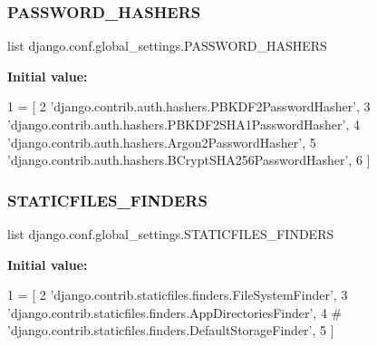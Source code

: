 \subsubsection{\texorpdfstring{P\+A\+S\+S\+W\+O\+R\+D\+\_\+\+H\+A\+S\+H\+E\+RS}{PASSWORD\_HASHERS}}
{\footnotesize\ttfamily list django.\+conf.\+global\+\_\+settings.\+P\+A\+S\+S\+W\+O\+R\+D\+\_\+\+H\+A\+S\+H\+E\+RS}

{\bfseries Initial value\+:}
\begin{DoxyCode}
1 =  [
2     \textcolor{stringliteral}{'django.contrib.auth.hashers.PBKDF2PasswordHasher'},
3     \textcolor{stringliteral}{'django.contrib.auth.hashers.PBKDF2SHA1PasswordHasher'},
4     \textcolor{stringliteral}{'django.contrib.auth.hashers.Argon2PasswordHasher'},
5     \textcolor{stringliteral}{'django.contrib.auth.hashers.BCryptSHA256PasswordHasher'},
6 ]
\end{DoxyCode}
\mbox{\label{namespacedjango_1_1conf_1_1global__settings_afd0fc571b22162beb11ee333d3189cec}} 
\subsubsection{\texorpdfstring{S\+T\+A\+T\+I\+C\+F\+I\+L\+E\+S\+\_\+\+F\+I\+N\+D\+E\+RS}{STATICFILES\_FINDERS}}
{\footnotesize\ttfamily list django.\+conf.\+global\+\_\+settings.\+S\+T\+A\+T\+I\+C\+F\+I\+L\+E\+S\+\_\+\+F\+I\+N\+D\+E\+RS}

{\bfseries Initial value\+:}
\begin{DoxyCode}
1 =  [
2     \textcolor{stringliteral}{'django.contrib.staticfiles.finders.FileSystemFinder'},
3     \textcolor{stringliteral}{'django.contrib.staticfiles.finders.AppDirectoriesFinder'},
4     \textcolor{comment}{# 'django.contrib.staticfiles.finders.DefaultStorageFinder',}
5 ]
\end{DoxyCode}
\mbox{\label{namespacedjango_1_1conf_1_1global__settings_a7f0c642e28b71c3c07ba3ed0254bf29d}} 
